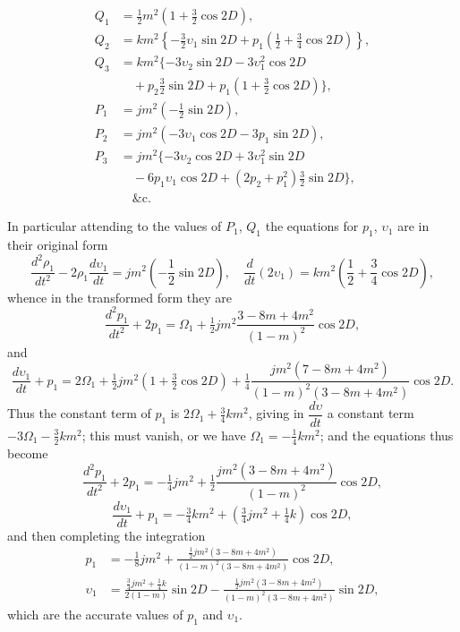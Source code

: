 \documentclass[11pt,a4paper]{article}
\theoremstyle{plain}
\theoremstyle{definition}
\theoremstyle{remark}
\begin{document}
\begin{align*}
Q_{1} &= \tfrac12 m^{2}(1 + \tfrac32 \cos 2D),\\
Q_{2} &= km^{2}\left\{-\tfrac32 \upsilon_{1}\sin 2D + p_{1}\left(\tfrac12 + \tfrac34 \cos 2D\right)\right\},\\
Q_{3} &= km^{2}\{-3\upsilon_{2}\sin 2D - 3\upsilon_{1}^{2}\cos 2D\\
&\quad + p_{2}\tfrac32 \sin 2D + p_{1}(1 + \tfrac32 \cos 2D)\},\\
P_{1} &= jm^{2}(-\tfrac12 \sin 2D),\\
P_{2} &= jm^{2}(-3\upsilon_{1}\cos 2D - 3p_{1}\sin 2D),\\
P_{3} &= jm^{2}\{-3\upsilon_{2}\cos 2D + 3\upsilon_{1}^{2}\sin 2D\\
&\quad - 6p_{1}\upsilon_{1}\cos 2D + (2p_{2} + p_{1}^{2})\tfrac32 \sin 2D\},\\
&\quad \&\text{c.}
\end{align*}

In particular attending to the values of $P_{1}$, $Q_{1}$ the equations for $p_{1}$, $\upsilon_{1}$ are in their original form
\[
\frac{d^{2}\rho_{1}}{dt^{2}}-2\rho_{1}\frac{d\upsilon_{1}}{dt}=jm^{2}\left(-\frac12\sin 2D\right), \quad \frac{d}{dt}(2\upsilon_{1})=km^{2}\left(\frac12 + \frac34 \cos 2D\right),
\]
whence in the transformed form they are
\[
\frac{d^{2}p_{1}}{dt^{2}}+2p_{1}=\Omega_{1}+\tfrac12 jm^{2}\frac{3-8m+4m^{2}}{(1-m)^{2}}\cos 2D,
\]
and
\[
\frac{d\upsilon_{1}}{dt}+p_{1}=2\Omega_{1}+\tfrac12 jm^{2}(1+\tfrac32 \cos 2D)+\tfrac14 \frac{jm^{2}(7-8m+4m^{2})}{(1-m)^{2}(3-8m+4m^{2})}\cos 2D.
\]
Thus the constant term of $p_{1}$ is $2\Omega_{1}+\tfrac34 km^{2}$, giving in $\dfrac{d\upsilon}{dt}$ a constant term $-3\Omega_{1}-\tfrac32 km^{2}$; this must vanish, or we have $\Omega_{1}=-\tfrac14 km^{2}$; and the equations thus become
\[
\frac{d^{2}p_{1}}{dt^{2}}+2p_{1}=-\tfrac14 jm^{2}+\tfrac12 \frac{jm^{2}(3-8m+4m^{2})}{(1-m)^{2}}\cos 2D,
\]
\[
\frac{d\upsilon_{1}}{dt}+p_{1}=-\tfrac34 km^{2}+(\tfrac34 jm^{2}+\tfrac14 k)\cos 2D,
\]
and then completing the integration
\begin{align*}
p_{1} &= -\tfrac18 jm^{2} + \frac{\tfrac12 jm^{2}(3-8m+4m^{2})}{(1-m)^{2}(3-8m+4m^{2})}\cos 2D,\\
\upsilon_{1} &= \frac{\tfrac34 jm^{2} + \tfrac14 k}{2(1-m)}\sin 2D - \frac{\tfrac12 jm^{2}(3-8m+4m^{2})}{(1-m)^{2}(3-8m+4m^{2})}\sin 2D,
\end{align*}
which are the accurate values of $p_{1}$ and $\upsilon_{1}$.
\end{document}
